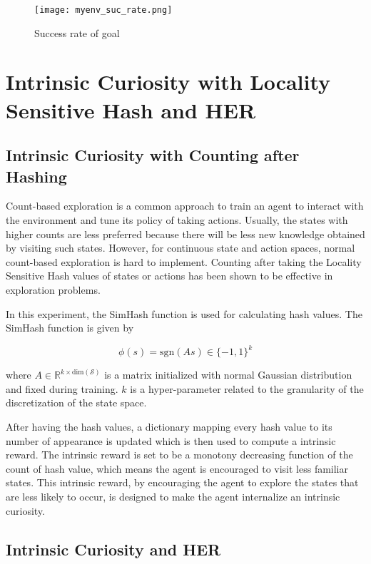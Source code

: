 \documentclass[a4paper, 12pt]{report}
\begin{document}
        \begin{figure}[H]
        \centering
        \texttt{[image: myenv\_suc\_rate.png]}
        \caption{Success rate of goal}
            \label{fcn_suc_rate}
        \end{figure}


\chapter {Intrinsic Curiosity with Locality Sensitive Hash and HER}

    \section{Intrinsic Curiosity with Counting after Hashing}
    
    Count-based exploration is a common approach to train an agent to interact with the environment and tune its policy of taking actions. Usually, the states with higher counts are less preferred because there will be less new knowledge obtained by visiting such states. However, for continuous state and action spaces, normal count-based exploration is hard to implement. Counting after taking the Locality Sensitive Hash values of states or actions has been shown to be effective in exploration problems\cite{DBLP:journals/corr/TangHFSCDSTA16}. 

    In this experiment, the SimHash\cite{Charikardept_similarityestimation} function is used for calculating hash values. The SimHash function is given by

    $$\phi(s)=\mathrm{sgn}(As)\in\{-1,1\}^k$$

    where $A\in \mathbb R^{k\times \mathrm{dim}(\mathcal S)}$ is a matrix initialized with normal Gaussian distribution and fixed during training. $k$ is a hyper-parameter related to the granularity of the discretization of the state space.

    After having the hash values, a dictionary mapping every hash value to its number of appearance is updated which is then used to compute a intrinsic reward. The intrinsic reward is set to be a monotony decreasing function of the count of hash value, which means the agent is encouraged to visit less familiar states. This intrinsic reward, by encouraging the agent to explore the states that are less likely to occur, is designed to make the agent internalize an intrinsic curiosity.

    \section{Intrinsic Curiosity and HER}
\end{document}
